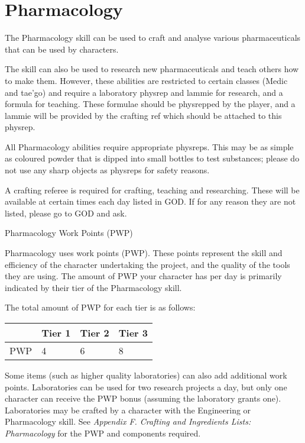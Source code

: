 \chapter{Pharmacology}

The Pharmacology skill can be used to craft and analyse various pharmaceuticals that can be used by characters.

The skill can also be used to research new pharmaceuticals and teach others how to make them. However, these abilities are restricted to certain classes (Medic and tae'go) and require a laboratory physrep and lammie for research, and a formula for teaching. These formulae should be physrepped by the player, and a lammie will be provided by the crafting ref which should be attached to this physrep.

All Pharmacology abilities require appropriate physreps. This may be as simple as coloured powder that is dipped into small bottles to test substances; please do not use any sharp objects as physreps for safety reasons.

A crafting referee is required for crafting, teaching and researching. These will be available at certain times each day listed in GOD. If for any reason they are not listed, please go to GOD and ask.

Pharmacology Work Points (PWP)

Pharmacology uses work points (PWP). These points represent the skill and efficiency of the character undertaking the project, and the quality of the tools they are using. The amount of PWP your character has per day is primarily indicated by their tier of the Pharmacology skill.

The total amount of PWP for each tier is as follows:

\begin{table}
\begin{tabular}{|l|l|l|l|} \hline 
 & Tier 1 & Tier 2 & Tier 3 \\
 \hline PWP & 4 & 6 & 8 \\
 \hline \end{tabular}

\end{table}

Some items (such as higher quality laboratories) can also add additional work points. Laboratories can be used for two research projects a day, but only one character can receive the PWP bonus (assuming the laboratory grants one). Laboratories may be crafted by a character with the Engineering or Pharmacology skill. See \textit{Appendix F. Crafting and Ingredients Lists: Pharmacology} for the PWP and components required.

